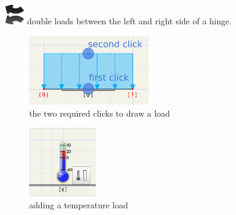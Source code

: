 \documentclass[a4paper,11pt]{report}
\begin{document}
\begin{minipage}[h]{\textwidth-4cm}
\begin{trivlist}
	\item[] \includegraphics[scale = 0.5]{../../icons/doubleL.png} double loads between the left and right side of a hinge.
\end{trivlist}
\end{minipage}

\begin{minipage}[b]{\textwidth/2}
\begin{figure}[H]
\begin{center}
\includegraphics[height=3cm]{./pictures/drawload_overlay.png}
\caption{the two required clicks to draw a load}
\label{pic:drawload}
\end{center}
\end{figure}
\end{minipage}
\begin{minipage}[b]{\textwidth/2}
\begin{figure}[H]
\begin{center}
\includegraphics[height=3cm]{./pictures/temp_wid.png}
\caption{adding a temperature load}
\label{pic:tempwidget}
\end{center}
\end{figure}
\end{minipage}
\end{document}
